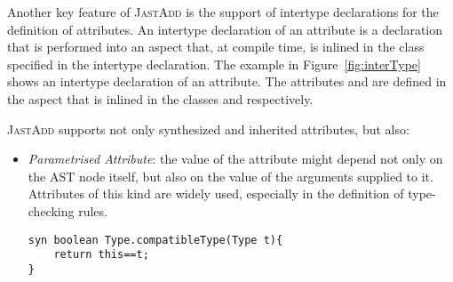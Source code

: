 Another key feature of \textsc{JastAdd}  is the support of intertype declarations for the definition of attributes. 
An intertype declaration of an attribute is a declaration that is performed into
an aspect that, at compile time,
is inlined in the class specified in the intertype declaration. The example in Figure~\ref{fig:interType}
shows an intertype declaration of an attribute.
The attributes  and  are defined in the aspect 
that is inlined in the classes  and  respectively.

\textsc{JastAdd} supports not only synthesized and inherited attributes, but also:
\begin{itemize}
    \item \emph{Parametrised Attribute}: the value of the attribute might depend
    not only on the AST node itself, but also on the value of the arguments supplied
    to it. Attributes of this kind are widely used, especially in the definition of
    type-checking rules.
    \begin{lstlisting}[language=JastAdd]
syn boolean Type.compatibleType(Type t){
    return this==t;
}
    \end{lstlisting}



\end{itemize}
